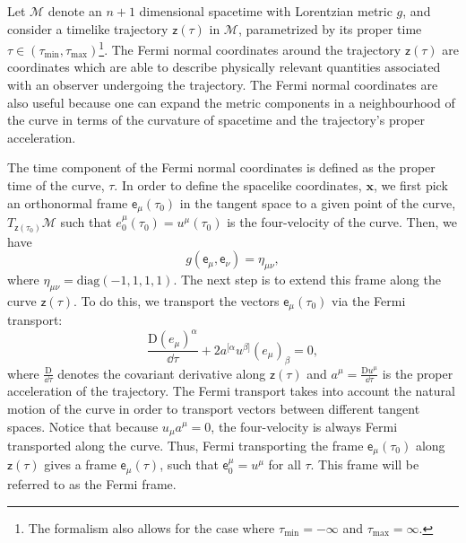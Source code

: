 \documentclass[letterpaper,12pt,titlepage,oneside,final]{book}
\newcommand{\mf}{\mathsf}%
\begin{document}
Let $\mathcal{M}$ denote an $n+1$ dimensional spacetime with Lorentzian metric $g$, and consider a timelike trajectory $\mf z(\tau)$ in $\mathcal{M}$, parametrized by its proper time \mbox{$\tau\in(\tau_{\text{min}},\tau_{\text{max}})$}\footnote{The formalism also allows for the case where $\tau_{\text{min}} = -\infty$ and $\tau_{\text{max}} = \infty$.}. The Fermi normal coordinates around the trajectory $\mf z(\tau)$ are coordinates which are able to describe physically relevant quantities associated with an observer undergoing the trajectory. The Fermi normal coordinates are also useful because one can expand the metric components in a neighbourhood of the curve in terms of the curvature of spacetime and the trajectory's proper acceleration.

The time component of the Fermi normal coordinates is defined as the proper time of the curve, $\tau$. In order to define the spacelike coordinates, $\bm x$, we first pick an orthonormal frame $\mf{e}_\mu(\tau_0)$ in the tangent space to a given point of the curve, $T_{\mf z(\tau_0)}\mathcal{M}$ such that $e_0^\mu(\tau_0) = u^\mu(\tau_0)$ is the four-velocity of the curve. Then, we have
\begin{equation}
    g(\mf e_\mu,\mf e_\nu) = \eta_{\mu\nu},
\end{equation}
where $\eta_{\mu\nu} = \text{diag}(-1,1,1,1)$. The next step is to extend this frame along the curve $\mf z(\tau)$. To do this, we transport the vectors $\mf e_\mu(\tau_0)$ via the Fermi transport:
\begin{equation}
    \frac{\text{D}(e_\mu)^\alpha}{\dd \tau} + 2a^{[\alpha}u^{\beta]}(e_\mu)_\beta = 0, 
\end{equation}
where $\frac{\text{D}}{\dd \tau}$ denotes the covariant derivative along $\mf z(\tau)$ and $a^\mu = \frac{\text{D}u^\mu}{\dd \tau}$ is the proper acceleration of the trajectory. The Fermi transport takes into account the natural motion of the curve in order to transport vectors between different tangent spaces. Notice that because $u_\mu a^\mu = 0$, the four-velocity is always Fermi transported along the curve. Thus, Fermi transporting the frame $\mf e_\mu(\tau_0)$ along $\mf z(\tau)$ gives a frame $\mf e_\mu(\tau)$, such that $\mf e^\mu_0 = u^\mu$ for all $\tau$. This frame will be referred to as the Fermi frame.
\end{document}
